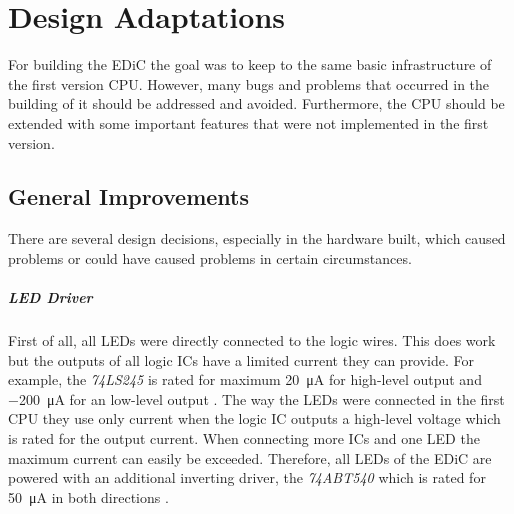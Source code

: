 \chapter{Design Adaptations}\label{cha:designChanges}
For building the \gls{EDiC} the goal was to keep to the same basic infrastructure of the first version \gls{CPU}.
However, many bugs and problems that occurred in the building of it should be addressed and avoided.
Furthermore, the \gls{CPU} should be extended with some important features that were not implemented in the first version.
\section{General Improvements}\label{sec:improvements}
There are several design decisions, especially in the hardware built, which caused problems or could have caused problems in certain circumstances.
\paragraph{LED Driver}
First of all, all \glspl{LED} were directly connected to the logic wires.
This does work but the outputs of all logic \glspl{IC} have a limited current they can provide.
For example, the \emph{74LS245} is rated for maximum \qty{20}{\uA} for high-level output and \qty{-200}{\micro\ampere} for an low-level output \cite{74ls245}.
The way the \glspl{LED} were connected in the first \gls{CPU} they use only current when the logic \gls{IC} outputs a high-level voltage which is rated for  the output current.
When connecting more \glspl{IC} and one \gls{LED} the maximum current can easily be exceeded.
Therefore, all \glspl{LED} of the \gls{EDiC} are powered with an additional inverting driver, the \emph{74ABT540} which is rated for \qty{50}{\uA} in both directions \cite{74abt540}.
